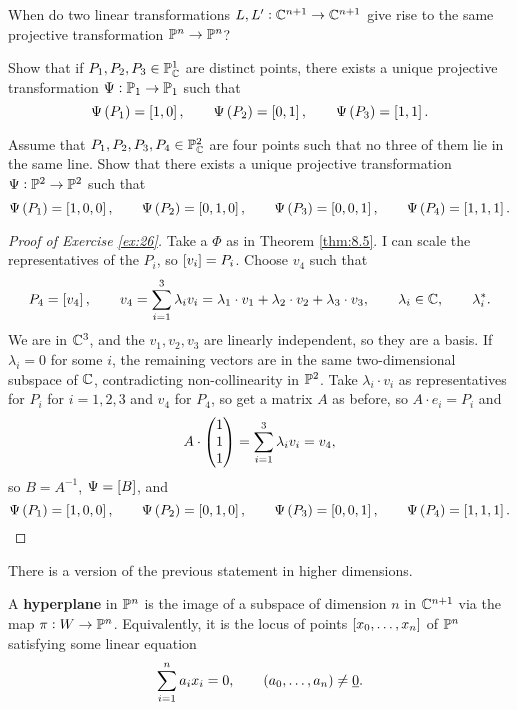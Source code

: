 \begin{exercise**}
When do two linear transformations $ L, L' : \mathbb{C}^{n + 1} \to \mathbb{C}^{n + 1} $ give rise to the same projective transformation $ \mathbb{P}^n \to \mathbb{P}^n $?
\end{exercise**}

\begin{exercise**}
Show that if $ P_1, P_2, P_3 \in \mathbb{P}^1_{\mathbb{C}} $ are distinct points, there exists a unique projective transformation $ \Psi : \mathbb{P}_1 \to \mathbb{P}_1 $ such that
$$ \Psi\br{P_1} = \sbr{1, 0}, \qquad \Psi\br{P_2} = \sbr{0, 1}, \qquad \Psi\br{P_3} = \sbr{1, 1}. $$
\end{exercise**}

\begin{exercise**}
\label{ex:26}
Assume that $ P_1, P_2, P_3, P_4 \in \mathbb{P}^2_{\mathbb{C}} $ are four points such that no three of them lie in the same line. Show that there exists a unique projective transformation $ \Psi : \mathbb{P}^2 \to \mathbb{P}^2 $ such that
$$ \Psi\br{P_1} = \sbr{1, 0, 0}, \qquad \Psi\br{P_2} = \sbr{0, 1, 0}, \qquad \Psi\br{P_3} = \sbr{0, 0, 1}, \qquad \Psi\br{P_4} = \sbr{1, 1, 1}. $$
\end{exercise**}

\pagebreak

\begin{proof}[Proof of Exercise \ref{ex:26}]
Take a $ \Phi $ as in Theorem \ref{thm:8.5}. I can scale the representatives of the $ P_i $, so $ \sbr{v_i} = P_i $. Choose $ v_4 $ such that
$$ P_4 = \sbr{v_4}, \qquad v_4 = \sum_{i = 1}^3 \lambda_i v_i = \lambda_1 \cdot v_1 + \lambda_2 \cdot v_2 + \lambda_3 \cdot v_3, \qquad \lambda_i \in \CC, \qquad \lambda_i^*. $$
We are in $ \mathbb{C}^3 $, and the $ v_1, v_2, v_3 $ are linearly independent, so they are a basis. If $ \lambda_i = 0 $ for some $ i $, the remaining vectors are in the same two-dimensional subspace of $ \mathbb{C} $, contradicting non-collinearity in $ \mathbb{P}^2 $. Take $ \lambda_i \cdot v_i $ as representatives for $ P_i $ for $ i = 1, 2, 3 $ and $ v_4 $ for $ P_4 $, so get a matrix $ A $ as before, so $ A \cdot e_i = P_i $ and
$$ A \cdot \begin{pmatrix} 1 \\ 1 \\ 1 \end{pmatrix} = \sum_{i = 1}^3 \lambda_iv_i = v_4, $$
so $ B = A^{-1} $, $ \Psi = \sbr{B} $, and
$$ \Psi\br{P_1} = \sbr{1, 0, 0}, \qquad \Psi\br{P_2} = \sbr{0, 1, 0}, \qquad \Psi\br{P_3} = \sbr{0, 0, 1}, \qquad \Psi\br{P_4} = \sbr{1, 1, 1}. $$
\end{proof}

There is a version of the previous statement in higher dimensions.

\begin{definition}
A \textbf{hyperplane} in $ \mathbb{P}^n $ is the image of a subspace of dimension $ n $ in $ \mathbb{C}^{n + 1} $ via the map $ \pi : W \to \mathbb{P}^n $. Equivalently, it is the locus of points $ \sbr{x_0, \dots, x_n} $ of $ \mathbb{P}^n $ satisfying some linear equation
$$ \sum_{i = 1}^n a_ix_i = 0, \qquad \br{a_0, \dots, a_n} \ne \underline{0}. $$
\end{definition}

